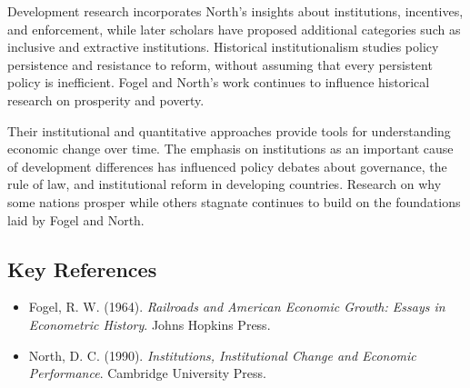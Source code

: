 Development research incorporates North's insights about institutions,
incentives, and enforcement, while later scholars have proposed additional
categories such as inclusive and extractive institutions. Historical
institutionalism studies policy persistence and resistance to reform, without
assuming that every persistent policy is inefficient. Fogel and North's work
continues to influence historical research on prosperity and poverty.

Their institutional and quantitative approaches provide tools for understanding
economic change over time. The emphasis on institutions as an important cause
of development differences has influenced policy debates about governance, the
rule of law, and institutional reform in developing countries.
Research on why some nations prosper while others stagnate continues to build
on the foundations laid by Fogel and North.

\subsection*{Key References}
\begin{itemize}
    \item Fogel, R. W. (1964). \textit{Railroads and American Economic Growth: Essays in Econometric History}. Johns Hopkins Press.
    \item North, D. C. (1990). \textit{Institutions, Institutional Change and Economic Performance}. Cambridge University Press.
\end{itemize}
